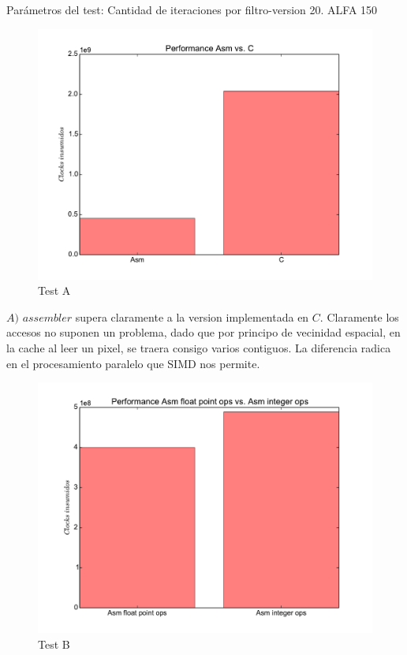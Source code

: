 Parámetros del test: 
Cantidad de iteraciones por filtro-version 20.
ALFA 150

\begin{figure}[h]
  \begin{center}
	\includegraphics[scale=0.5]{ldrA.pdf}
	\caption{Test A}
  \end{center}
\end{figure}

$A)$ $assembler$ supera claramente a la version implementada en $C$. Claramente los accesos no suponen un problema, dado que por principo de vecinidad espacial, en la cache al leer un pixel, se traera consigo varios contiguos. La diferencia radica en el procesamiento paralelo que SIMD nos permite.

\begin{figure}[h]
  \begin{center}
	\includegraphics[scale=0.5]{ldrB.pdf}
	\caption{Test B}
  \end{center}
\end{figure}

